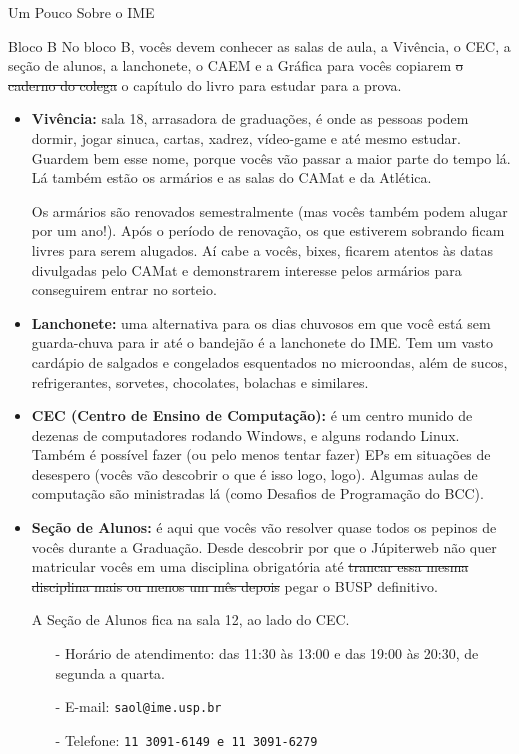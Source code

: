 \begin{secao}{Um Pouco Sobre o IME}
\begin{subsecao}{Bloco B}
No bloco B, vocês devem conhecer as salas de aula, a Vivência, o CEC, 
a seção de alunos, a lanchonete, o CAEM e a Gráfica para vocês 
copiarem \sout{o caderno do colega} o capítulo do livro para estudar para a prova.

\begin{itemize}
\item {\bf Vivência:} sala 18, arrasadora de graduações, é onde as pessoas podem
dormir, jogar sinuca, cartas, xadrez, vídeo-game e até
mesmo estudar. Guardem bem esse nome, porque vocês vão passar a maior parte do tempo lá.
Lá também estão os armários e as salas do CAMat e da Atlética.

Os armários são renovados semestralmente (mas vocês também podem alugar por um ano!). 
Após o período de renovação, os que estiverem sobrando ficam livres para serem alugados. 
Aí cabe a vocês, bixes, ficarem atentos às datas divulgadas pelo CAMat e demonstrarem 
interesse pelos armários para conseguirem entrar no sorteio.

\item {\bf Lanchonete:} uma alternativa para os dias chuvosos em que você está sem
  guarda-chuva para ir até o bandejão é a lanchonete do IME. Tem um vasto
  cardápio de salgados e congelados esquentados no microondas, além de sucos,
  refrigerantes, sorvetes, chocolates, bolachas e similares.

\item {\bf CEC (Centro de Ensino de Computação):} é um centro munido de dezenas
de computadores rodando Windows, e alguns rodando Linux. Também é possível fazer
(ou pelo menos tentar fazer) EPs em situações de desespero (vocês vão descobrir o que é
isso logo, logo). Algumas aulas de computação são ministradas lá (como Desafios
de Programação do BCC).

\item {\bf Seção de Alunos:} é aqui que vocês vão resolver quase todos os
pepinos de vocês durante a Graduação. Desde descobrir por que o Júpiterweb não
quer matricular vocês em uma disciplina obrigatória até \sout{trancar essa mesma
disciplina mais ou menos um mês depois} pegar o BUSP definitivo. %

A Seção de Alunos fica na sala 12, ao lado do CEC.
\begin{itemize}
\item[-] Horário de atendimento: das 11:30 às 13:00 e das 19:00 às 20:30, de segunda a quarta.
\item[-] E-mail: \tt{saol@ime.usp.br}
\item[-] Telefone: \tt{11 3091-6149} e \tt{11 3091-6279}
\end{itemize}


\end{itemize}
\end{subsecao}
\end{secao}
